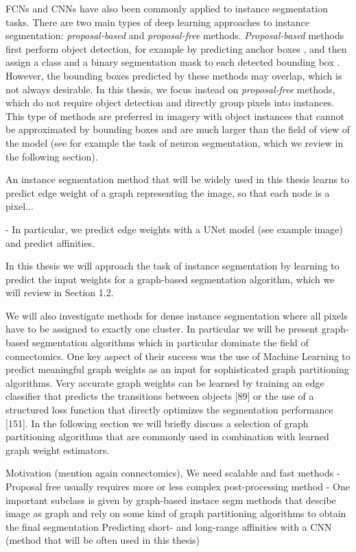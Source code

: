 FCNs and CNNs have also been commonly applied to instance segmentation tasks.
There are two main types of deep learning approaches to instance segmentation: \emph{proposal-based} and \emph{proposal-free} methods. 
\emph{Proposal-based} methods first perform object detection, for example by predicting anchor boxes \cite{ren2015faster}, and then assign a class and a binary segmentation mask to each detected bounding box \cite{he2017mask,porzi2019seamless}.
However, the bounding boxes predicted by these methods may overlap, which is not always desirable. 
In this thesis, we focus instead on \emph{proposal-free} methods, which do not require object detection and directly group pixels into instances. 
This type of methods are preferred in imagery with object instances that cannot be approximated by bounding boxes and are much larger than the field of view of the model (see for example the task of neuron segmentation, which we review in the following section). 

An instance segmentation method that will be widely used in this thesis learns to predict edge weight of a graph representing the image, so that each node is a pixel...

- In particular, we predict edge weights with a UNet model (see example image) and predict affinities.


In this thesis we will approach the task of instance segmentation by learning to predict the input weights for a graph-based segmentation algorithm, which we will review in Section 1.2. 

We will also investigate methods for dense instance segmentation where all pixels have to be assigned to exactly one cluster. In particular we will be present graph-based segmentation algorithms which in particular dominate the ﬁeld of connectomics. One key aspect of their success was the use of Machine Learning to predict meaningful graph weights as an input for sophisticated graph partitioning algorithms. Very accurate graph weights can be learned by training an edge classiﬁer that predicts the transitions between objects [89] or the use of a structured loss function that directly optimizes the segmentation performance [151]. In the following section we will brieﬂy discuss a selection of graph partitioning algorithms that are commonly used in combination with learned graph weight estimators.




Motivation (mention again connectomics), We need scalable and fast methods
- Proposal free usually requires more or less complex post-processing method
- One important subclass is given by graph-based instace segm methods that descibe image as graph and rely on some kind of graph partitioning algorithms to obtain the final segmentation    Predicting short- and long-range affinities with a CNN (method that will be often used in this thesis)
 
